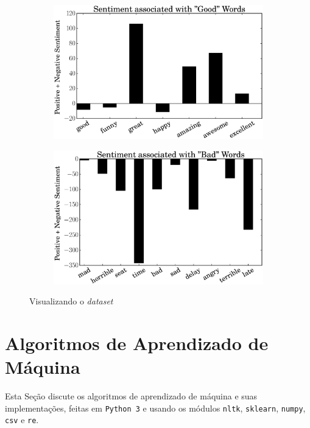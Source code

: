 \documentclass[a4paper, 12pt]{article}
\begin{document}
\begin{figure}[htpb]
\begin{subfigure}[htpb]{0.45\textwidth}
        \includegraphics[width=\textwidth]{airline_good_words}
        \caption{}
        \label{fig:gwd}
    \end{subfigure}
    \begin{subfigure}[htpb]{0.45\textwidth}
        \includegraphics[width=\textwidth]{airline_bad_words}
        \caption{}
        \label{fig:bwd}
    \end{subfigure}
    \caption{Visualizando o \textit{dataset}}\label{fig:viz}
\end{figure}

\section{Algoritmos de Aprendizado de Máquina}

Esta Seção discute os algoritmos de aprendizado de máquina
e suas implementações, feitas em \texttt{Python 3} e usando os
módulos \texttt{nltk}, \texttt{sklearn}, \texttt{numpy},
\texttt{csv} e \texttt{re}.
\end{document}
